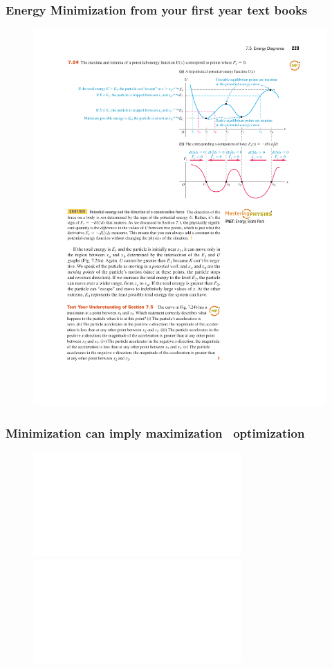 \documentclass[hyperref={colorlinks=true}]{beamer}
\begin{document}

\begin{frame}%
  \frametitle{Energy Minimization from your first year text books}

  \begin{figure}
    \centering
    \includegraphics[width=\textwidth]{MinimaMaximaEnergy.pdf}
  \end{figure}

\end{frame}


\begin{frame}%
  \frametitle{Minimization can imply maximization \ra\ optimization}

  \begin{figure}
    \centering
    \includegraphics<1>[width=\textwidth,angle=0]{PotentialEnergy.pdf}
    \includegraphics<2>[width=\textwidth,angle=180]{PotentialEnergy.pdf}
  \end{figure}

\end{frame}
\end{document}
